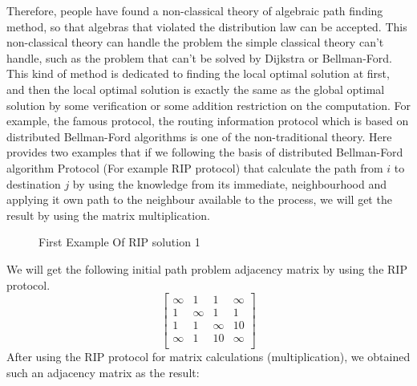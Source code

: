 \documentclass[a4paper,12pt,twoside,openright]{report}
\begin{document}
Therefore, people have found a non-classical theory of algebraic path finding method, so that algebras that violated the distribution law can be accepted. This non-classical theory can handle the problem the simple classical theory can't handle, such as the problem that can't be solved by Dijkstra or Bellman-Ford.
This kind of method is dedicated to finding the local optimal solution at first, and then the local optimal solution is exactly the same as the global optimal solution by some verification or some addition restriction on the computation. For example, the famous protocol, the routing information protocol which is based on distributed Bellman-Ford algorithms is one of the non-traditional theory.
Here provides two examples that if we following the basis of distributed Bellman-Ford algorithm Protocol (For example RIP protocol) that calculate the path from $i$ to destination $j$ by using the knowledge from its immediate, neighbourhood and applying it own path to the neighbour available to the process, we will get the result by using the matrix multiplication.
\begin{figure}[H]
\centering
{}
\label{example:rip:1}
\caption{First Example Of RIP solution 1}
\end{figure}
We will get the following initial path problem adjacency matrix by using the RIP protocol.
\[
\begin{bmatrix}
    \infty & 1 & 1 & \infty \\
    1 & \infty & 1 & 1 \\
    1 & 1 & \infty & 10 \\
    \infty & 1 & 10 & \infty \\
\end{bmatrix}
\]
After using the RIP protocol for matrix calculations (multiplication), we obtained such an adjacency matrix as the result:
\end{document}
